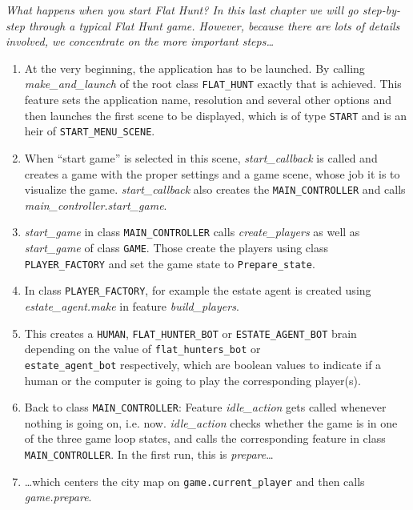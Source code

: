 \emph{What happens when you start \emph{Flat Hunt}? In this last chapter we will go step-by-step through a typical \emph{Flat Hunt} game. However, because there are lots of details involved, we concentrate on the more important steps\ldots}

\begin{enumerate}
  \item At the very beginning, the application has to be launched. By calling\\ \textit{make\_and\_launch} of the root class \texttt{FLAT\_HUNT} exactly that is achieved. This feature sets the application name, resolution and several other options and then launches the first scene to be displayed, which is of type \texttt{START} and is an heir of \texttt{START\_MENU\_SCENE}.
  \item When ``start game'' is selected in this scene, \textit{start\_callback} is called and creates a game with the proper settings and a game scene, whose job it is to visualize the game. \textit{start\_callback} also creates the \texttt{MAIN\_CONTROLLER} and calls \textit{main\_controller.start\_game}.
  \item \textit{start\_game} in class \texttt{MAIN\_CONTROLLER} calls \textit{create\_players} as well as \textit{start\_game} of class \texttt{GAME}. Those create the players using class\\ \texttt{PLAYER\_FACTORY} and set the game state to \texttt{Prepare\_state}.
  \item In class \texttt{PLAYER\_FACTORY}, for example the estate agent is created using \textit{estate\_agent.make} in feature \textit{build\_players}.
  \item This creates a \texttt{HUMAN}, \texttt{FLAT\_HUNTER\_BOT} or \texttt{ESTATE\_AGENT\_BOT} brain depending on the value of \texttt{flat\_hunters\_bot} or\\ \texttt{estate\_agent\_bot} respectively, which are boolean values to indicate if a human or the computer is going to play the corresponding player(s).
  \item Back to class \texttt{MAIN\_CONTROLLER}: Feature \textit{idle\_action} gets called whenever nothing is going on, i.e. now. \textit{idle\_action} checks whether the game is in one of the three game loop states, and calls the corresponding feature in class \texttt{MAIN\_CONTROLLER}. In the first run, this is \textit{prepare}\ldots
  \item \ldots which centers the city map on \texttt{game.current\_player} and then calls \textit{game.prepare}.

\end{enumerate}
